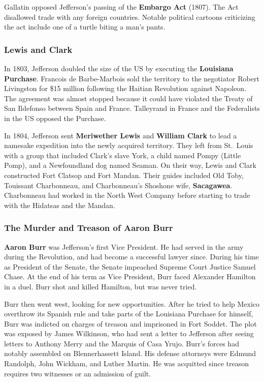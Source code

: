 Gallatin opposed Jefferson's passing of the \textbf{Embargo Act} (1807).
The Act disallowed trade with any foreign countries.
Notable political cartoons criticizing the act include one of a turtle biting a man's pants.

\subsubsection*{Lewis and Clark}

In 1803, Jefferson doubled the size of the US by executing the \textbf{Louisiana Purchase}.
Francois de Barbe-Marbois sold the territory to the negotiator Robert Livingston for \$15 million
following the Haitian Revolution against Napoleon.
The agreement was almost stopped because it could have violated the Treaty of San Ildefonso between Spain and France.
Talleyrand in France and the Federalists in the US opposed the Purchase.

In 1804, Jefferson sent \textbf{Meriwether Lewis} and \textbf{William Clark}
to lead a namesake expedition into the newly acquired territory.
They left from St.\ Louis with a group that included
Clark's slave York, a child named Pompy (Little Pomp), and a Newfoundland dog named Seaman.
On their way, Lewis and Clark constructed Fort Clatsop and Fort Mandan.
Their guides included Old Toby, Touissant Charbonneau, and Charbonneau's Shoshone wife, \textbf{Sacagawea}.
Charbonneau had worked in the North West Company before starting to trade with the Hidatsas and the Mandan.

\subsubsection*{The Murder and Treason of Aaron Burr}

\textbf{Aaron Burr} was Jefferson's first Vice President.
He had served in the army during the Revolution, and had become a successful lawyer since.
During his time as President of the Senate, the Senate impeached Supreme Court Justice Samuel Chase.
At the end of his term as Vice President, Burr faced Alexander Hamilton in a duel.
Burr shot and killed Hamilton, but was never tried.

Burr then went west, looking for new opportunities.
After he tried to help Mexico overthrow its Spanish rule and take parts of the Louisiana Purchase for himself,
Burr was indicted on charges of treason and imprisoned in Fort Soddet.
The plot was exposed by James Wilkinson, who had sent a letter to Jefferson
after seeing letters to Anthony Merry and the Marquis of Casa Yrujo.
Burr's forces had notably assembled on Blennerhassett Island.
His defense attorneys were Edmund Randolph, John Wickham, and Luther Martin.
He was acquitted since treason requires two witnesses or an admission of guilt.

